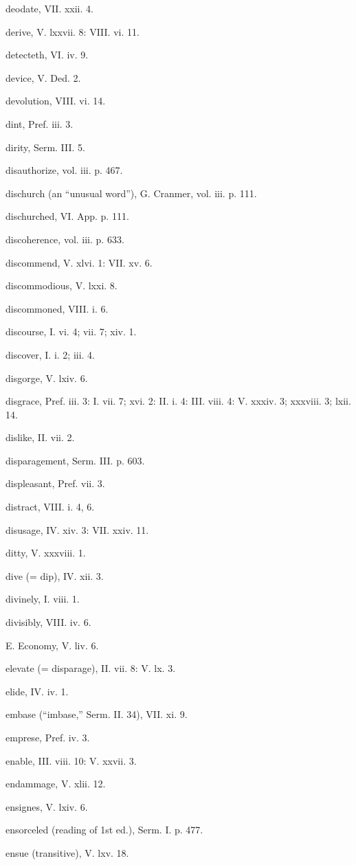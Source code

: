 deodate, VII. xxii. 4.

derive, V. lxxvii. 8: VIII. vi. 11.

detecteth, VI. iv. 9.

device, V. Ded. 2.

devolution, VIII. vi. 14.

dint, Pref. iii. 3.

dirity, Serm. III. 5.

disauthorize, vol. iii. p. 467.

dischurch (an “unusual word”), G. Cranmer, vol. iii. p. 111.

dischurched, VI. App. p. 111.

discoherence, vol. iii. p. 633.

discommend, V. xlvi. 1: VII. xv. 6.

discommodious, V. lxxi. 8.

discommoned, VIII. i. 6.

discourse, I. vi. 4; vii. 7; xiv. 1.

discover, I. i. 2; iii. 4.

disgorge, V. lxiv. 6.

disgrace, Pref. iii. 3: I. vii. 7; xvi. 2: II. i. 4: III. viii. 4: V. xxxiv. 3; xxxviii. 3; lxii. 14.

dislike, II. vii. 2.

disparagement, Serm. III. p. 603.

displeasant, Pref. vii. 3.

distract, VIII. i. 4, 6.

disusage, IV. xiv. 3: VII. xxiv. 11.

ditty, V. xxxviii. 1.

dive (= dip), IV. xii. 3.

divinely, I. viii. 1.

divisibly, VIII. iv. 6.

E.
Economy, V. liv. 6.

elevate (= disparage), II. vii. 8: V. lx. 3.

elide, IV. iv. 1.

embase (“imbase,” Serm. II. 34), VII. xi. 9.

emprese, Pref. iv. 3.

enable, III. viii. 10: V. xxvii. 3.

endammage, V. xlii. 12.

ensignes, V. lxiv. 6.

ensorceled (reading of 1st ed.), Serm. I. p. 477.

ensue (transitive), V. lxv. 18.

